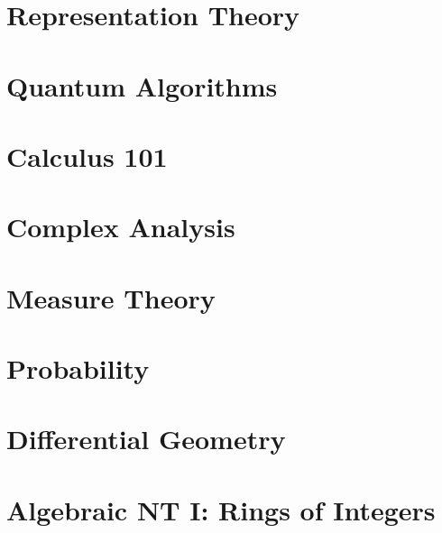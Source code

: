 \documentclass[11pt,twoside=semi,openright,numbers=noenddot]{scrbook}
\begin{document}
\part{Representation Theory}
\parttoc





\part{Quantum Algorithms}
\parttoc




\part{Calculus 101}
\parttoc






\part{Complex Analysis}
\parttoc




\part{Measure Theory}
\parttoc






\part{Probability}
\parttoc



\part{Differential Geometry}
\parttoc



\part{Algebraic NT I: Rings of Integers}
\parttoc





\end{document}
